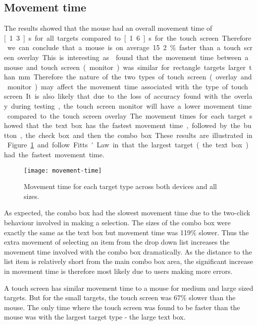 \documentclass{elsart}
\begin{document}
\subsection{Movement time}
\label{sec-results-movement}

The results showed that the mouse had an overall movement time of
\unit[1.3]{s} for all targets compared to \unit[1.6]{s} for the touch
screen. Therefore we can conclude that a mouse is on average 15.2\%
faster than a touch screen overlay. This is interesting as
\citet{Sear-A-1991-IJMMS} found that the movement time between a mouse
and touch screen (monitor) was similar for rectangle targets larger than
\unit[2]{mm}. Therefore the nature of the two types of touch screen
(overlay and monitor) may affect the movement time associated with the
type of touch screen. It is also likely that due to the loss of accuracy
found with the overlay during testing, the touch screen monitor will
have a lower movement time compared to the touch screen overlay.

The movement times for each target showed that the text box has the
fastest movement time, followed by the button, the check box and then
the combo box. These results are illustrated in
Figure~\ref{fig-movement-time} and follow Fitts' Law in that the largest
target (the text box) had the fastest movement time.

\begin{figure}
	\centering
	\texttt{[image: movement-time]}
	\caption{Movement time for each target type across both devices and
	all sizes.}
	\label{fig-movement-time}
\end{figure}

As expected, the combo box had the slowest movement time due to the
two-click behaviour involved in making a selection. The sizes of the
combo box were exactly the same as the text box but movement time was
119\% slower. Thus the extra movement of selecting an item from the drop
down list increases the movement time involved with the combo box
dramatically. As the distance to the list item is relatively short from
the main combo box area, the significant increase in movement time is
therefore most likely due to users making more errors.

A touch screen has similar movement time to a mouse for medium and large
sized targets. But for the small targets, the touch screen was 67\%
slower than the mouse. The only time where the touch screen was found to
be faster than the mouse was with the largest target type - the large
text box.
\end{document}
